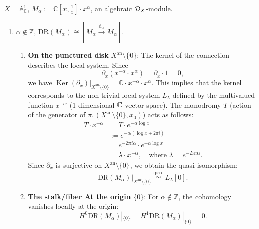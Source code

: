 \begin{example}\label{ex:regular-holonomic-simple-module-in-dimension-1}
    $X = \mathbb{A}^1_{\mathbb{C}}$,  $M_{\alpha} := \mathbb{C}[x, \frac{1}{x}] \cdot x^{\alpha}$, an algebraic $\mathcal{D}_X$-module.
    \begin{enumerate}
        \item $\alpha \not\in \mathbb{Z}$, $\mathrm{DR}(M_{\alpha}) \cong [M_{\alpha} \xrightarrow{\mathrm{d}_{\alpha}} M_{\alpha}]$.
              \begin{enumerate}
                  \item \textbf{On the punctured disk } $X^\mathrm{an} \setminus \{0\}$:
                        The kernel of the connection describes the local system. Since
                        \[
                            \partial_{x}(x^{-\alpha} \cdot x^{\alpha}) = \partial_{x} \cdot 1 = 0,
                        \]
                        we have $\operatorname{Ker}(\partial_{x})|_{X^\mathrm{an} \setminus \{0\}} = \mathbb{C} \cdot x^{-\alpha} \cdot x^{\alpha}$. This implies that the kernel corresponds to the non-trivial local system $L_{\lambda}$ defined by the multivalued function $x^{-\alpha}$ (1-dimensional $\mathbb{C}$-vector space). The monodromy $T$ (action of the generator of $\pi_1(X^{\mathrm{an}} \setminus \{0\}, x_0) $) acts as follows:
                        \begin{align*}
                            T \cdot x^{-\alpha} & = T \cdot e^{-\alpha \log x}                                                   \\
                                                & := e^{-\alpha(\log x + 2\pi i)}                                                \\
                                                & = e^{-2\pi i \alpha} \cdot e^{-\alpha \log x}                                  \\
                                                & = \lambda \cdot x^{-\alpha}, \quad \text{where } \lambda = e^{-2\pi i \alpha}.
                        \end{align*}
                        Since $\partial_{x}$ is surjective on $X^\mathrm{an} \setminus \{0\}$, we obtain the quasi-isomorphism:
                        \[
                            \mathrm{DR}(M_{\alpha})|_{X^\mathrm{an} \setminus \{0\}} \overset{\text{qiso.}}{\simeq} L_{\lambda}[0].
                        \]

                  \item \textbf{The stalk/fiber At the origin } $\{0\}$:
                        For $\alpha \notin \mathbb{Z}$, the cohomology vanishes locally at the origin:
                        \[
                            H^{0}\mathrm{DR}(M_{\alpha})|_{\{0\}} = H^{1}\mathrm{DR}(M_{\alpha})|_{\{0\}} = 0.
                        \]
              \end{enumerate}



\end{enumerate}
\end{example}
